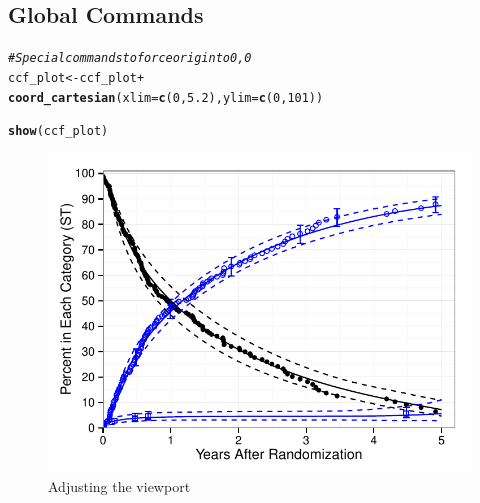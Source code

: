 \documentclass[nojss]{jss}\usepackage[]{graphicx}\usepackage[]{color}
\makeatletter
\def\maxwidth{ %
  \ifdim\Gin@nat@width>\linewidth
    \linewidth
  \else
    \Gin@nat@width
  \fi
}
\newcommand{\hlnum}[1]{\textcolor[rgb]{0.686,0.059,0.569}{#1}}%
\newcommand{\hlcom}[1]{\textcolor[rgb]{0.678,0.584,0.686}{\textit{#1}}}%
\newcommand{\hlopt}[1]{\textcolor[rgb]{0,0,0}{#1}}%
\newcommand{\hlstd}[1]{\textcolor[rgb]{0.345,0.345,0.345}{#1}}%
\newcommand{\hlkwb}[1]{\textcolor[rgb]{0.69,0.353,0.396}{#1}}%
\newcommand{\hlkwc}[1]{\textcolor[rgb]{0.333,0.667,0.333}{#1}}%
\newcommand{\hlkwd}[1]{\textcolor[rgb]{0.737,0.353,0.396}{\textbf{#1}}}%
\newenvironment{kframe}{%
 \def\at@end@of@kframe{}%
 \ifinner\ifhmode%
  \def\at@end@of@kframe{\end{minipage}}%
  \begin{minipage}{\columnwidth}%
 \fi\fi%
 \def\FrameCommand##1{\hskip\@totalleftmargin \hskip-\fboxsep
 \colorbox{shadecolor}{##1}\hskip-\fboxsep
     \hskip-\linewidth \hskip-\@totalleftmargin \hskip\columnwidth}%
 \MakeFramed {\advance\hsize-\width
   \@totalleftmargin\z@ \linewidth\hsize
   \@setminipage}}%
 {\par\unskip\endMakeFramed%
 \at@end@of@kframe}
\newenvironment{knitrout}{}{} %
\makeatother
\begin{document}
\subsection{Global Commands}\label{S:globals}

\begin{knitrout}\footnotesize
{}\color{fgcolor}\begin{kframe}
\begin{alltt}
\hlcom{# Special commands to force origin to 0,0}
\hlstd{ccf_plot} \hlkwb{<-} \hlstd{ccf_plot} \hlopt{+}
  \hlkwd{coord_cartesian}\hlstd{(}\hlkwc{xlim}\hlstd{=}\hlkwd{c}\hlstd{(}\hlnum{0}\hlstd{,}\hlnum{5.2}\hlstd{),} \hlkwc{ylim}\hlstd{=}\hlkwd{c}\hlstd{(}\hlnum{0}\hlstd{,}\hlnum{101}\hlstd{))}

\hlkwd{show}\hlstd{(ccf_plot)}
\end{alltt}
\end{kframe}\begin{figure}[htpb]


{\centering \includegraphics[width=\maxwidth]{figure/beamer-global_} 

}

\caption[Adjusting the viewport]{Adjusting the viewport\label{F:global,}}
\end{figure}


\end{knitrout}


\end{document}
